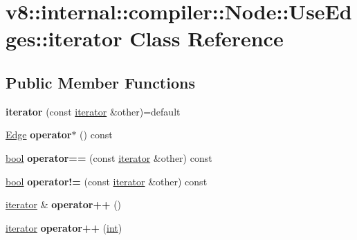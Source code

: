 \hypertarget{classv8_1_1internal_1_1compiler_1_1Node_1_1UseEdges_1_1iterator}{}\section{v8\+:\+:internal\+:\+:compiler\+:\+:Node\+:\+:Use\+Edges\+:\+:iterator Class Reference}
\label{classv8_1_1internal_1_1compiler_1_1Node_1_1UseEdges_1_1iterator}
\subsection*{Public Member Functions}
\begin{DoxyCompactItemize}
\item 
\mbox{\label{classv8_1_1internal_1_1compiler_1_1Node_1_1UseEdges_1_1iterator_a66f49abd939fb4ccc29ac7009730df87}} 
{\bfseries iterator} (const \mbox{\hyperlink{classv8_1_1internal_1_1compiler_1_1Node_1_1UseEdges_1_1iterator}{iterator}} \&other)=default
\item 
\mbox{\label{classv8_1_1internal_1_1compiler_1_1Node_1_1UseEdges_1_1iterator_a237fc8a79bfba3a0805b657fc24d299c}} 
\mbox{\hyperlink{classv8_1_1internal_1_1compiler_1_1Edge}{Edge}} {\bfseries operator$\ast$} () const
\item 
\mbox{\label{classv8_1_1internal_1_1compiler_1_1Node_1_1UseEdges_1_1iterator_a07472c30c3f65aa7f1f678b31b73a7cb}} 
\mbox{\hyperlink{classbool}{bool}} {\bfseries operator==} (const \mbox{\hyperlink{classv8_1_1internal_1_1compiler_1_1Node_1_1UseEdges_1_1iterator}{iterator}} \&other) const
\item 
\mbox{\label{classv8_1_1internal_1_1compiler_1_1Node_1_1UseEdges_1_1iterator_aed0856133889a9df706331d877b378c7}} 
\mbox{\hyperlink{classbool}{bool}} {\bfseries operator!=} (const \mbox{\hyperlink{classv8_1_1internal_1_1compiler_1_1Node_1_1UseEdges_1_1iterator}{iterator}} \&other) const
\item 
\mbox{\label{classv8_1_1internal_1_1compiler_1_1Node_1_1UseEdges_1_1iterator_af328d4ca29d42691ae7845625fa42c09}} 
\mbox{\hyperlink{classv8_1_1internal_1_1compiler_1_1Node_1_1UseEdges_1_1iterator}{iterator}} \& {\bfseries operator++} ()
\item 
\mbox{\label{classv8_1_1internal_1_1compiler_1_1Node_1_1UseEdges_1_1iterator_aee7b458c8967b9663e0dfb21198226c7}} 
\mbox{\hyperlink{classv8_1_1internal_1_1compiler_1_1Node_1_1UseEdges_1_1iterator}{iterator}} {\bfseries operator++} (\mbox{\hyperlink{classint}{int}})
\end{DoxyCompactItemize}
